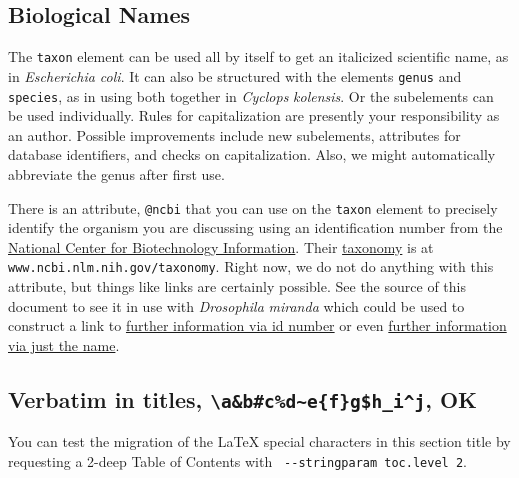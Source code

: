 \documentclass[10pt,]{article}
\theoremstyle{plain}
\theoremstyle{definition}
\theoremstyle{definition}
\theoremstyle{definition}
\theoremstyle{definition}
\theoremstyle{definition}
\theoremstyle{definition}
\numberwithin{equation}{section}
\begin{document}
\subsection[{Biological Names}]{Biological Names}\label{subsection-17}
\hypertarget{p-249}{}%
The \lstinline?taxon? element can be used all by itself to get an italicized scientific name, as in \textit{Escherichia coli}.  It can also be structured with the elements \lstinline?genus? and \lstinline?species?, as in using both together in \textit{Cyclops} \textit{kolensis}.  Or the subelements can be used individually.  Rules for capitalization are presently your responsibility as an author.  Possible improvements include new subelements, attributes for database identifiers, and checks on capitalization.  Also, we might automatically abbreviate the genus after first use.%
\par
\hypertarget{p-250}{}%
There is an attribute, \lstinline?@ncbi? that you can use on the \lstinline?taxon? element to precisely identify the organism you are discussing using an identification number from the \href{https://www.ncbi.nlm.nih.gov/}{National Center for Biotechnology Information}.  Their \href{https://www.ncbi.nlm.nih.gov/taxonomy}{taxonomy} is at \lstinline?www.ncbi.nlm.nih.gov/taxonomy?.  Right now, we do not do anything with this attribute, but things like links are certainly possible.  See the source of this document to see it in use with \textit{Drosophila} \textit{miranda} which could be used to construct a link to \href{https://www.ncbi.nlm.nih.gov/Taxonomy/Browser/wwwtax.cgi?id=7229}{further information via id number} or even \href{https://www.ncbi.nlm.nih.gov/Taxonomy/Browser/wwwtax.cgi?name=Drosophila+miranda}{further information via just the name}.%
\typeout{************************************************}
\typeout{************************************************}
\subsection[{Verbatim in titles, \texttt{\textbackslash{}a\&b\#c\%d\textasciitilde{}e\{f\}g\$h\_i\textasciicircum{}j}, OK}]{Verbatim in titles, \texttt{\textbackslash{}a\&b\#c\%d\textasciitilde{}e\{f\}g\$h\_i\textasciicircum{}j}, OK}\label{subsection-18}
\hypertarget{p-251}{}%
You can test the migration of the \LaTeX{} special characters in this section title by requesting a 2-deep Table of Contents with \lstinline? --stringparam toc.level 2?.%
\typeout{************************************************}
\typeout{************************************************}
\end{document}
